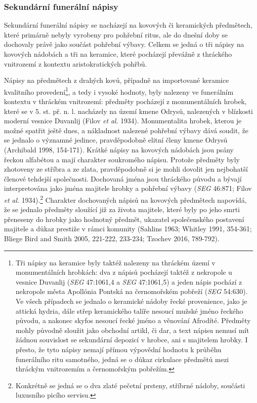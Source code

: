 \subsubsection[sekundární-funerální-nápisy]{Sekundární funerální nápisy}

Sekundární funerální nápisy se nacházejí na kovových či keramických předmětech, které primárně nebyly vyrobeny pro pohřební ritus, ale do dnešní doby se dochovaly právě jako součást pohřební výbavy. Celkem se jedná o tři nápisy na kovových nádobách a tři na keramice, které pocházejí převážně z thráckého vnitrozemí z kontextu aristokratických pohřbů.

Nápisy na předmětech z drahých kovů, případně na importované keramice kvalitního provedení\footnote{Tři nápisy na keramice byly taktéž nalezeny na thráckém území v monumentálních hrobkách: dva z nápisů pocházejí taktéž z nekropole u vesnice Duvanlij ({\em SEG} 47:1061,4 a {\em SEG} 47:1061,5) a jeden nápis pochází z nekropole města Apollónia Pontská na černomořském pobřeží ({\em SEG} 54:630). Ve všech případech se jednalo o keramické nádoby řecké provenience, jako je attická hydria, dále střep keramického talíře nesoucí mužské jméno řeckého původu, a nakonec skyfos nesoucí řecké jméno a věnování Afrodíté. Předměty mohly původně sloužit jako obchodní artikl, či dar, a text nápisu nemusí mít žádnou souvislost se sekundární depozicí v hrobce, ani s majitelem hrobky. I přesto, že tyto nápisy nemají přímou výpovědní hodnotu k průběhu funerálního ritu samotného, jedná se o důkaz cirkulace předmětů mezi thráckým vnitrozemím a černomořským pobřežím.}, a tedy i vysoké hodnoty, byly nalezeny ve funerálním kontextu v thráckém vnitrozemí: předměty pocházejí z monumentálních hrobek, které se v 5. st. př. n. l. nacházely na území kmene Odrysů, nalezených v blízkosti moderní vesnice Duvanlij (Filov {\em et al.} 1934). Monumentalita hrobek, kterou je možné spatřit ještě dnes, a nákladnost nalezené pohřební výbavy dává soudit, že se jednalo o významné jedince, pravděpodobně elitní členy kmene Odrysů (Archibald 1998, 154-171). Krátké nápisy na kovových nádobách jsou psány řeckou alfabétou a mají charakter soukromého nápisu. Protože předměty byly zhotoveny ze stříbra a ze zlata, pravděpodobně si je mohli dovolit jen nejbohatší členové tehdejší společnosti. Dochovaná jména jsou thráckého původu a bývají interpretována jako jména majitele hrobky a pohřební výbavy ({\em SEG} 46:871; Filov {\em et al.} 1934).\footnote{Konkrétně se jedná se o dva zlaté pečetní prsteny, stříbrné nádoby, součásti luxusního picího servisu.} Charakter dochovaných nápisů na kovových předmětech napovídá, že se jednalo předměty sloužící již za života majitele, které byly po jeho smrti přeneseny do hrobky jako hodnotný předmět, ukazatel společenského postavení majitele a důkaz prestiže v rámci komunity (Sahlins 1963; Whitley 1991, 354-361; Bliege Bird and Smith 2005, 221-222, 233-234; Tzochev 2016, 789-792).

